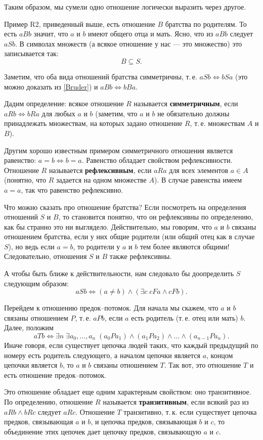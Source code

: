 \begin{enumerate}
Таким образом, мы сумели одно отношение логически выразить через другое.

Пример R2, приведенный выше, есть отношение $B$ братства по родителям. То есть $aBb$ значит, что $a$ и $b$ имеют общего отца и мать. Ясно, что из $aBb$ следует $aSb$. В символах множеств (а всякое отношение у нас --- это множество) это записывается так:
$$
B\subseteq S.
$$

Заметим, что оба вида отношений братства симметричны, т.\,е. $aSb\Leftrightarrow bSa$ (это можно доказать из \eqref{Bruder}) и $aBb\Leftrightarrow bBa$.

Дадим определение: всякое отношение $R$ называется \textbf{симметричным}, если $aRb\Leftrightarrow bRa$ для любых $a$ и $b$ (заметим, что $a$ и $b$ не обязательно должны принадлежать множествам, на которых задано отношение $R$, т.\,е. множествам $A$ и $B$).

Другим хорошо известным примером симметричного отношения является равенство: $a=b\Leftrightarrow b=a$. Равенство обладает свойством рефлексивности. Отношение $R$ называется \textbf{рефлексивным}, если $aRa$ для всех элементов $a\in A$ (понятно, что $R$ задается на одном множестве $A$). В случае равенства имеем $a=a$, так что равенство рефлексивно. 

Что можно сказать про отношение братства? Если посмотреть на определения отношений $S$ и $B$, то становится понятно, что он рефлексивны по определению, как бы странно это ни выглядело. Действительно, мы говорим, что $a$ и $b$ связаны отношением братства, если у них общие родители (или общий отец как в случае $S$), но ведь если $a=b$, то родители у $a$ и $b$ тем более являются общими! Следовательно, отношения $S$ и $B$ также рефлексивны.

А чтобы быть ближе к действительности, нам следовало бы доопределить $S$ следующим образом:
$$
aSb\iff (a\ne b)\land(\exists c\; cFa\land cFb).
$$

Перейдем к отношению предок--потомок. Для начала мы скажем, что $a$ и $b$ связаны отношением $P$, т.\,е. $aPb$, если $a$ есть родитель (т.\,е. отец или мать) $b$. Далее, положим
$$
aTb\iff \exists n\;\exists a_0,\dots,a_n\;(a_0Pa_1)\land(a_1Pa_2)\land\dots\land(a_{n-1}Pa_n).
$$
Иначе говоря, если существует цепочка людей таких, что каждый предыдущий по номеру есть родитель следующего, а началом цепочки является $a$, концом цепочки является $b$, то $a$ и $b$ связаны отношением $T$. Так вот, это отношение $T$ и есть отношение предок--потомок.

Это отношение обладает еще одним характерным свойством: оно транзитивное. По определению, отношение $R$ называется \textbf{транзитивным}, если всякий раз из $aRb\land bRc$ следует $aRc$. Отношение $T$ транзитивно, т.\,к. если существует цепочка предков, связывающая $a$ и $b$, и цепочка предков, связывающая $b$ и $c$, то объединение этих цепочек дает цепочку предков, связывающую $a$ и $c$.


\end{enumerate}
